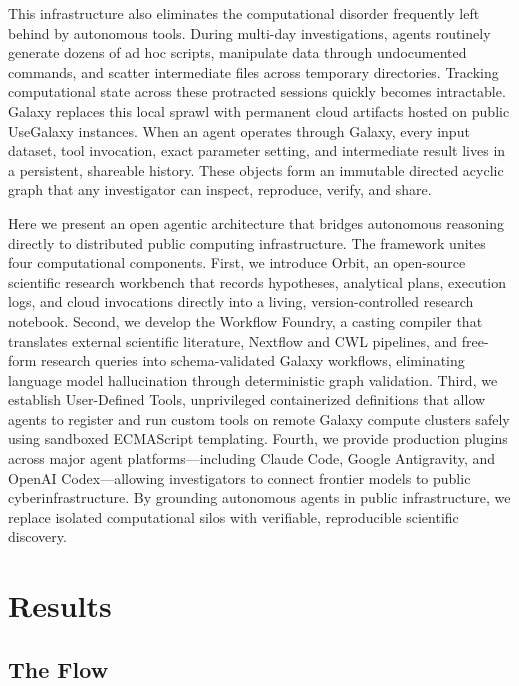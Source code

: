 \documentclass[11pt,letterpaper]{article}
\begin{document}
This infrastructure also eliminates the computational disorder frequently left behind by autonomous tools. During multi-day investigations, agents routinely generate dozens of ad hoc scripts, manipulate data through undocumented commands, and scatter intermediate files across temporary directories. Tracking computational state across these protracted sessions quickly becomes intractable. Galaxy replaces this local sprawl with permanent cloud artifacts hosted on public UseGalaxy instances. When an agent operates through Galaxy, every input dataset, tool invocation, exact parameter setting, and intermediate result lives in a persistent, shareable history. These objects form an immutable directed acyclic graph that any investigator can inspect, reproduce, verify, and share.

Here we present an open agentic architecture that bridges autonomous reasoning directly to distributed public computing infrastructure. The framework unites four computational components. First, we introduce Orbit, an open-source scientific research workbench that records hypotheses, analytical plans, execution logs, and cloud invocations directly into a living, version-controlled research notebook. Second, we develop the Workflow Foundry, a casting compiler that translates external scientific literature, Nextflow \cite{nextflow2017} and CWL \cite{cwl2022} pipelines, and free-form research queries into schema-validated Galaxy workflows, eliminating language model hallucination through deterministic graph validation. Third, we establish User-Defined Tools, unprivileged containerized definitions that allow agents to register and run custom tools on remote Galaxy compute clusters safely using sandboxed ECMAScript templating. Fourth, we provide production plugins across major agent platforms---including Claude Code, Google Antigravity, and OpenAI Codex---allowing investigators to connect frontier models to public cyberinfrastructure. By grounding autonomous agents in public infrastructure, we replace isolated computational silos with verifiable, reproducible scientific discovery.

\section{Results}

\subsection{The Flow}
\end{document}
